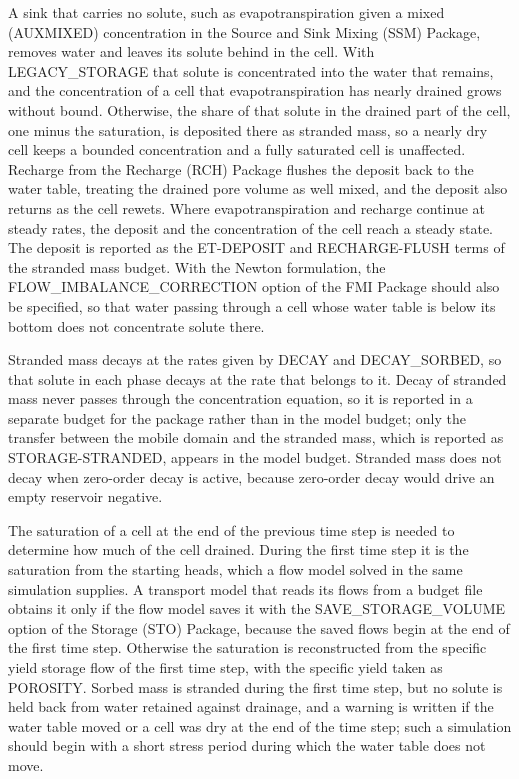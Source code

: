 A sink that carries no solute, such as evapotranspiration given a mixed (AUXMIXED) concentration in the Source and Sink Mixing (SSM) Package, removes water and leaves its solute behind in the cell.  With LEGACY\_STORAGE that solute is concentrated into the water that remains, and the concentration of a cell that evapotranspiration has nearly drained grows without bound.  Otherwise, the share of that solute in the drained part of the cell, one minus the saturation, is deposited there as stranded mass, so a nearly dry cell keeps a bounded concentration and a fully saturated cell is unaffected.  Recharge from the Recharge (RCH) Package flushes the deposit back to the water table, treating the drained pore volume as well mixed, and the deposit also returns as the cell rewets.  Where evapotranspiration and recharge continue at steady rates, the deposit and the concentration of the cell reach a steady state.  The deposit is reported as the ET-DEPOSIT and RECHARGE-FLUSH terms of the stranded mass budget.  With the Newton formulation, the FLOW\_IMBALANCE\_CORRECTION option of the FMI Package should also be specified, so that water passing through a cell whose water table is below its bottom does not concentrate solute there.

Stranded mass decays at the rates given by DECAY and DECAY\_SORBED, so that solute in each phase decays at the rate that belongs to it.  Decay of stranded mass never passes through the concentration equation, so it is reported in a separate budget for the package rather than in the model budget; only the transfer between the mobile domain and the stranded mass, which is reported as STORAGE-STRANDED, appears in the model budget.  Stranded mass does not decay when zero-order decay is active, because zero-order decay would drive an empty reservoir negative.

The saturation of a cell at the end of the previous time step is needed to determine how much of the cell drained.  During the first time step it is the saturation from the starting heads, which a flow model solved in the same simulation supplies.  A transport model that reads its flows from a budget file obtains it only if the flow model saves it with the SAVE\_STORAGE\_VOLUME option of the Storage (STO) Package, because the saved flows begin at the end of the first time step.  Otherwise the saturation is reconstructed from the specific yield storage flow of the first time step, with the specific yield taken as POROSITY. Sorbed mass is stranded during the first time step, but no solute is held back from water retained against drainage, and a warning is written if the water table moved or a cell was dry at the end of the time step; such a simulation should begin with a short stress period during which the water table does not move.

